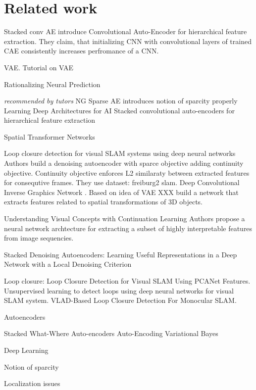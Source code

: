 
\chapter{Related work}
\label{cha:rewo}
Stacked conv AE \cite{Masci2011} introduce Convolutional Auto-Encoder for hierarchical feature extraction.
They claim, that initializing CNN with convolutional layers of trained CAE consistently increases perfromance of a CNN.

VAE. Tutorial on VAE \cite{Doersch2016}

Rationalizing Neural Prediction \cite{Lei2016}


\textit{recommended by tutors}
NG Sparse AE  \cite{Ng2011} introduces notion of sparcity properly
Learning Deep Architectures for AI \cite{Bengio2009}
Stacked convolutional auto-encoders for hierarchical feature extraction \cite{Masci2011}

Spatial Transformer Networks \cite{Jaderberg2015}

Loop closure detection for visual SLAM systems using deep neural networks \cite{Gao2015}
Authors build a denoising autoencoder with sparce objective adding continuity objective.
Continuity objective enforces L2 similaraty between extracted features for consequtive frames. They use dataset: freiburg2 slam.
Deep Convolutional Inverse Graphics Network \cite{Kulkarni2015}.
Based on idea of VAE XXX build a network that extracts features related to spatial transformations of 3D objects.

Understanding Visual Concepts with Continuation Learning \cite{Whitney2016}
Authors propose a neural network archtecture for extracting a subset of highly interpretable features
from image sequencies.

Stacked Denoising Autoencoders: Learning Useful Representations in a Deep Network with a Local Denoising Criterion \cite{Vincent2010}

Loop closure:
Loop Closure Detection for Visual SLAM Using PCANet Features.
Unsupervised learning to detect loops using deep neural networks for visual SLAM system.
VLAD-Based Loop Closure Detection For Monocular SLAM.
\cite{Xia2016, Gao2015a, Huang2016}



Autoencoders

Stacked What-Where Auto-encoders \cite{Zhao2015}
Auto-Encoding Variational Bayes \cite{Kingma2013}

Deep Learning \cite{LeCun2015}

Notion of sparcity


Localization issues
